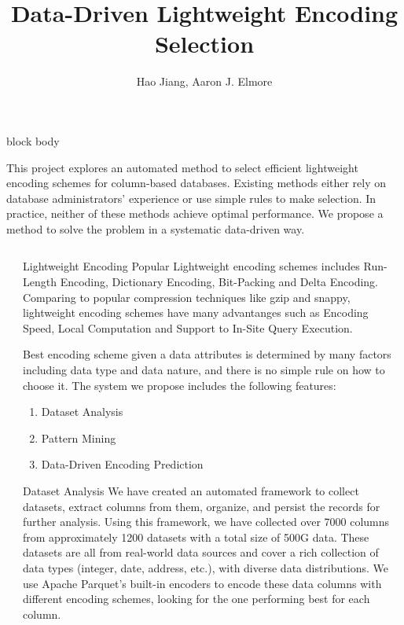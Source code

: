 \documentclass{beamer}
\title{Data-Driven Lightweight Encoding Selection}
\author{Hao Jiang, Aaron J. Elmore} %
\institute{Department of Computer Science\\ The University of Chicago} %
\date{}
\newlength{\sepwid}
\newlength{\onecolwid}
\begin{document}
  
 


\begin{frame}[t] %
 
\begin{beamercolorbox}[colsep*=2ex,vmode]{block body}

This project explores an automated method to select efficient lightweight
encoding schemes for column-based databases. Existing
methods either rely on database administrators' experience or use simple rules
to make selection. In practice, neither of these methods achieve optimal
performance. We propose a method to solve the problem in a systematic
data-driven way.
 

\end{beamercolorbox}

\begin{columns}[t] 
\begin{column}{\sepwid}\end{column} %

\begin{column}{\onecolwid} %
          
\begin{block}{Lightweight Encoding}
Popular Lightweight encoding schemes includes Run-Length Encoding, Dictionary
Encoding, Bit-Packing and Delta Encoding. Comparing to popular compression
techniques like gzip and snappy, lightweight encoding schemes have many
advantanges such as Encoding Speed, Local Computation and Support to In-Site
Query Execution.

Best encoding scheme given a data attributes is determined by many
factors including data type and data nature, and there is no simple rule on
how to choose it. The system we propose includes the following features:
\begin{enumerate}\setlength{\itemindent}{1.5em}
  \item Dataset Analysis
  \item Pattern Mining
  \item Data-Driven Encoding Prediction
\end{enumerate}
\end{block}


\begin{block}{Dataset Analysis}
We have created an automated framework to collect datasets, extract columns from
them, organize, and persist the records for further analysis. Using this
framework, we have collected over 7000 columns from approximately 1200 datasets
with a total size of 500G data. These datasets are all from real-world data
sources and cover a rich collection of data types (integer, date, address,
etc.), with diverse data distributions. We use Apache Parquet's built-in
encoders to encode these data columns with different encoding schemes, looking
for the one performing best for each column.


\end{block}
\end{column}
\end{columns}
\end{frame}
\end{document}
